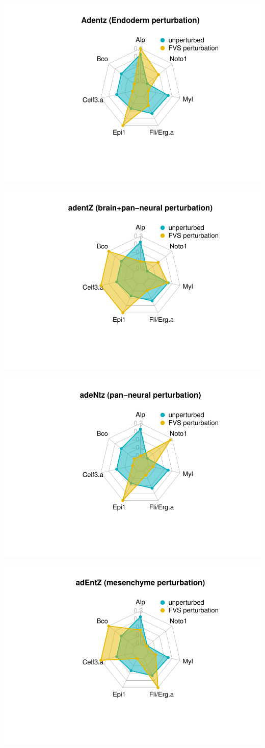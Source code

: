 \documentclass[
]{book}
\theoremstyle{definition}
\theoremstyle{definition}
\theoremstyle{definition}
\theoremstyle{definition}
\theoremstyle{remark}
\begin{document}
\begin{center}\includegraphics[width=0.5\linewidth]{_main_files/figure-latex/unnamed-chunk-21-1} \end{center}

\begin{center}\includegraphics[width=0.5\linewidth]{_main_files/figure-latex/unnamed-chunk-21-2} \end{center}

\begin{center}\includegraphics[width=0.5\linewidth]{_main_files/figure-latex/unnamed-chunk-21-3} \end{center}

\begin{center}\includegraphics[width=0.5\linewidth]{_main_files/figure-latex/unnamed-chunk-21-4} \end{center}
\end{document}
